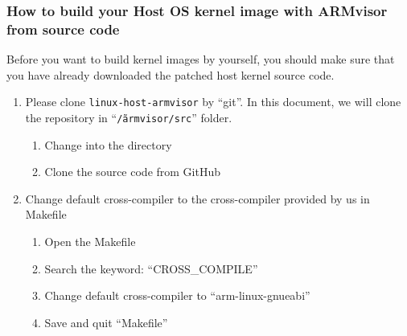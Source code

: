\documentclass[12pt]{article}  %
\begin{document}
\subsubsection{How to build your Host OS kernel image with ARMvisor from source code}

Before you want to build kernel images by yourself, you should make sure that you have already downloaded the patched host kernel source code.

\begin{enumerate}
\item Please clone \texttt{linux-host-armvisor} by ``git''. In this document, we will clone the repository in ``\texttt{\~/armvisor/src}'' folder.
\begin{enumerate}
\item Change into the directory\newline
{}\newline
{}\newline

\item Clone the source code from GitHub\newline
{}

\end{enumerate}

\item Change default cross-compiler to the cross-compiler provided by us in Makefile
\begin{enumerate}

\item Open the Makefile



\item Search the keyword: ``CROSS\_COMPILE''

\item Change default cross-compiler to ``arm-linux-gnueabi''


\item Save and quit ``Makefile''

\end{enumerate}


\end{enumerate}
\end{document}
